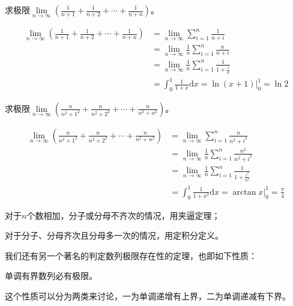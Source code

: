     \begin{example}
        求极限$ \lim\limits_{n \to \infty}(\displaystyle\frac{1}{n+1}+\displaystyle\frac{1}{n+2}+\cdots+\displaystyle\frac{1}{n+n}) $。
    \end{example}
    \begin{solution}
        \begin{align*}
            \lim_{n \to \infty}(\frac{1}{n+1}+\frac{1}{n+2}+\cdots+\frac{1}{n+n})
            &=\lim_{n \to \infty}\sum_{i=1}^n\frac{1}{n+i} \\
            &=\lim_{n \to \infty}\frac{1}{n}\sum_{i=1}^n\frac{n}{n+i}\\
            &=\lim_{n \to \infty}\frac{1}{n}\sum_{i=1}^n\frac{1}{1+\frac{i}{n}}\\
            &= \int_0^1\frac{1}{1+x}\mathrm{d}x=\ln(x+1)\bigg|_{0} ^1=\ln 2
        \end{align*}
    \end{solution}

    \begin{example}
        求极限$ \lim\limits_{n \to \infty}(\displaystyle\frac{n}{n^2+1^2}+\displaystyle\frac{n}{n^2+2^2}+\cdots+\displaystyle\frac{n}{n^2+n^2}) $。
    \end{example}
    \begin{solution}
        \begin{align*}
            \lim_{n \to \infty}(\frac{n}{n^2+1^2}+\frac{n}{n^2+2^2}+\cdots+\frac{n}{n^2+n^2})
            &=\lim_{n \to \infty}\sum_{i=1}^n\frac{n}{n^2+i^2} \\
            &=\lim_{n \to \infty}\frac{1}{n}\sum_{i=1}^n\frac{n^2}{n^2+i^2}\\
            &=\lim_{n \to \infty}\frac{1}{n}\sum_{i=1}^n\frac{1}{1+\frac{i^2}{n^2}}\\
            &= \int_0^1\frac{1}{1+x^2}\mathrm{d}x=\arctan x\bigg|_{0} ^1=\frac{\pi}{4}
        \end{align*}
    \end{solution}
    \begin{note}
        对于$n$个数相加，分子或分母不齐次的情况，用夹逼定理；
        
        对于分子、分母齐次且分母多一次的情况，用定积分定义。
    \end{note}
    我们还有另一个著名的判定数列极限存在性的定理，也即如下性质：
    \begin{property}
        单调有界数列必有极限。
    \end{property}
    这个性质可以分为两类来讨论，一为单调递增有上界，二为单调递减有下界。
